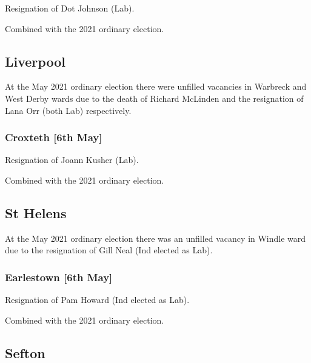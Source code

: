 \documentclass[a4paper,openany]{book}
\begin{document}
\begin{resultsiii}
Resignation of Dot Johnson (Lab).

Combined with the 2021 ordinary election.

\subsection*{Liverpool}

At the May 2021 ordinary election there were unfilled vacancies in Warbreck and West Derby wards due to the death of Richard McLinden and the resignation of Lana Orr (both Lab) respectively.

\subsubsection*{Croxteth \hspace*{\fill}\nolinebreak[1]%
	\enspace\hspace*{\fill}
	[6th May]}


Resignation of Joann Kusher (Lab).

Combined with the 2021 ordinary election.

\subsection*{St Helens}

At the May 2021 ordinary election there was an unfilled vacancy in Windle ward due to the resignation of Gill Neal (Ind elected as Lab).

\subsubsection*{Earlestown \hspace*{\fill}\nolinebreak[1]%
	\enspace\hspace*{\fill}
	[6th May]}


Resignation of Pam Howard (Ind elected as Lab).

Combined with the 2021 ordinary election.

\subsection*{Sefton}


\end{resultsiii}
\end{document}

